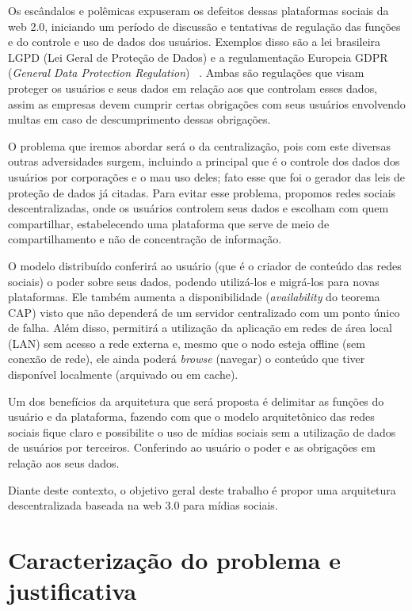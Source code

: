 Os escândalos e polêmicas expuseram os defeitos dessas plataformas sociais da web 2.0, iniciando um período de discussão e tentativas de regulação das funções e do controle e uso de dados dos usuários.
Exemplos disso são a lei brasileira LGPD (Lei Geral de Proteção de Dados) e a regulamentação Europeia GDPR (\textit{General Data Protection Regulation})~\cite{LGPD1} \cite{GPDR1}.
Ambas são regulações que visam proteger os usuários e seus dados em relação aos que controlam esses dados, assim as empresas devem cumprir certas obrigações com seus usuários envolvendo multas em caso de descumprimento dessas obrigações.

O problema que iremos abordar será o da centralização, pois com este diversas outras adversidades surgem, incluindo a principal que é o controle dos dados dos usuários por corporações e o mau uso deles; fato esse que foi o gerador das leis de proteção de dados já citadas.
Para evitar esse problema, propomos redes sociais descentralizadas, onde os usuários controlem seus dados e escolham com quem compartilhar, estabelecendo uma plataforma que serve de meio de compartilhamento e não de concentração de informação.

O modelo distribuído conferirá ao usuário (que é o criador de conteúdo das redes sociais) o poder sobre seus dados, podendo utilizá-los e migrá-los para novas plataformas.
Ele também aumenta a disponibilidade (\textit{availability} do teorema CAP) visto que não dependerá de um servidor centralizado com um ponto único de falha.
Além disso, permitirá a utilização da aplicação em redes de área local (LAN) sem acesso a rede externa e, mesmo que o nodo esteja offline (sem conexão de rede), ele ainda poderá \textit{browse} (navegar) o conteúdo que tiver disponível localmente (arquivado ou em cache).

Um dos benefícios da arquitetura que será proposta é delimitar as funções do usuário e da plataforma, fazendo com que o modelo arquitetônico das redes sociais fique claro e possibilite o uso de mídias sociais sem a utilização de dados de usuários por terceiros.
Conferindo ao usuário o poder e as obrigações em relação aos seus dados.

Diante deste contexto, o objetivo geral deste trabalho é propor uma arquitetura descentralizada baseada na web 3.0 para mídias sociais.

\chapter{\label{chap:problem}Caracterização do problema e justificativa}


